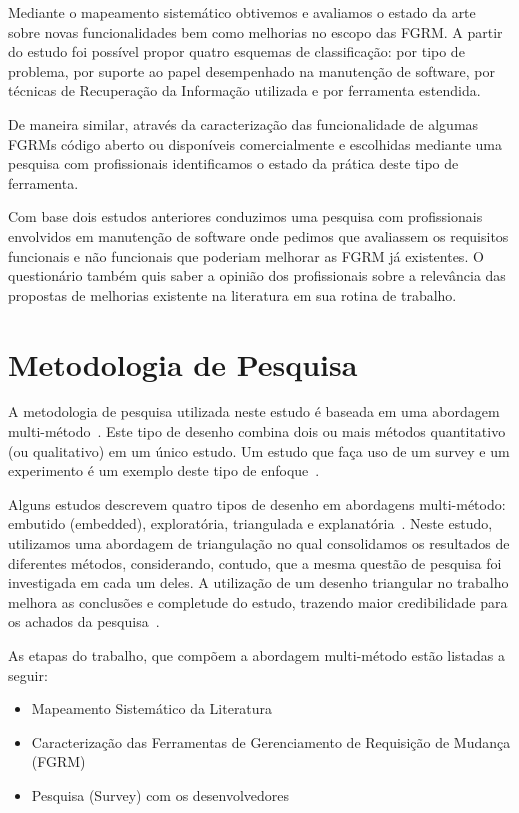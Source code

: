 Mediante o mapeamento sistemático obtivemos e avaliamos o estado da arte sobre
novas funcionalidades bem como melhorias no escopo das FGRM\@. A partir do
estudo foi possível propor quatro esquemas de classificação: por tipo de
problema, por suporte ao papel desempenhado na manutenção de software, por
técnicas de Recuperação da Informação utilizada e por ferramenta
estendida.

De maneira similar, através da caracterização das funcionalidade de algumas
FGRMs código aberto ou disponíveis comercialmente e escolhidas mediante uma
pesquisa com profissionais identificamos o estado da prática deste tipo de
ferramenta.

Com base dois estudos anteriores conduzimos uma pesquisa com profissionais
envolvidos em manutenção de software onde pedimos que avaliassem os requisitos
funcionais e não funcionais que poderiam melhorar as FGRM já existentes. O
questionário também quis saber a opinião dos profissionais sobre a relevância
das propostas de me\-lho\-ri\-as existente na literatura em sua rotina de
trabalho.

\section{Metodologia de Pesquisa}
\label{sec:intro-metodologia}

A metodologia de pesquisa utilizada neste estudo é baseada em uma abordagem
multi-método~\cite{hesse2010mixed}. Este tipo de desenho  combina dois ou mais
métodos quantitativo (ou qualitativo) em um único estudo. Um estudo que faça uso
de um survey e um experimento é um exemplo deste tipo de
enfoque~\cite{hesse2010mixed}.

Alguns estudos descrevem quatro tipos de desenho em abordagens multi-método:
embutido (embedded), exploratória, triangulada e
explanatória~\cite{creswell2007designing}. Neste estudo, utilizamos uma
abordagem de triangulação no qual consolidamos os resultados de diferentes
métodos, considerando, contudo, que a mesma questão de pesquisa foi investigada
em cada um deles. A utilização de um desenho triangular no trabalho melhora as
conclusões e completude do estudo, trazendo maior credibilidade para os achados
da pesquisa~\cite{hesse2010mixed}.

As etapas do trabalho, que compõem a abordagem multi-método estão listadas a
seguir:

\begin{itemize}[(i)]
	\item Mapeamento Sistemático da Literatura~\cite{Petersen2008}
	\item Caracterização das Ferramentas de Gerenciamento de Requisição de
		Mudança (FGRM)
	\item Pesquisa (Survey) com os
		desenvolvedores~\cite{wohlin2012experimentation}
\end{itemize}

